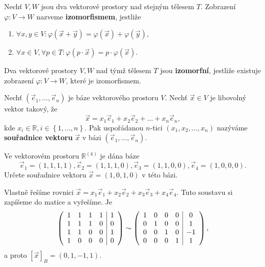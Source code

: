 \begin{definition}
	Nechť $V, W$ jsou dva vektorové prostory nad stejným tělesem $T$. Zobrazení $\varphi :V\to W$ nazveme \textbf{izomorfismem},
	jestliže
	\begin{enumerate}[$i.$]
    \item $\forall x,y \in V\colon \varphi(\vec x+\vec y)=\varphi(\vec x)+\varphi(\vec y),$
    	\item $\forall x \in V, \forall p \in T\colon \varphi(p\cdot \vec x) = p\cdot \varphi(\vec x).$
    \end{enumerate}
\end{definition}

\begin{definition}
    Dva vektorové prostory $V,W$ nad týmž tělesem $T$ jsou \textbf{izomorfní}, jestliže existuje zobrazení
    $\varphi: V\to W$, které je izomorfismem.
\end{definition}

\begin{definition}
    Nechť $(\vec e_1, \dots, \vec e_n)$ je báze vektorového prostoru $V$. Nechť
    $\vec x \in V$ je libovolný vektor takový, že
    $$\vec x = x_1\vec e_1 + x_2\vec e_2 + \dots + x_n\vec e_n,$$
    kde $x_i \in \mathbb R, i\in \left \{ 1,\dots,n \right \} .$ Pak uspořádanou
    $n$-tici $(x_1, x_2,\dots,x_n)$ nazýváme \textbf{souřadnice vektoru} $\vec x$ v
    bázi $(\vec e_1, \dots, \vec e_n)$.
\end{definition}

\begin{priklad}
Ve vektorovém prostoru $\mathbb R^{(4)}$ je dána báze
\begin{equation*}
    \vec e_1=(1,1,1,1), \vec e_2 = (1,1,1,0), \vec e_3 = (1,1,0,0), \vec e_4 = (1,0,0,0).
\end{equation*}
Určete souřadnice vektoru $\vec x = (1,0,1,0)$ v této bázi.
\end{priklad}

\begin{reseni}
Vlastně řešíme rovnici $\vec x= x_1\vec e_1 + x_2\vec e_2 + x_3\vec e_3 + x_4\vec e_4.$
Tuto soustavu si zapíšeme do matice a vyřešíme. Je
$$
\left (
\begin{array}{c c c c | c }
    1 & 1 & 1 & 1 & 1 \\
	1 & 1 & 1 & 0 & 0 \\
	1 & 1 & 0 & 0 & 1\\
	1 & 0 & 0 & 0 & 0
\end{array}
\right ) \sim \left (
\begin{array}{c c c c | c }
    1 & 0 & 0 & 0 & 0\\
    0 & 1 & 0 & 0 & 1\\
    0 & 0 & 1 & 0 & -1 \\
    0 & 0 & 0 & 1 & 1
\end{array}
\right ),
$$
a proto $[\vec x]_B = (0,1,-1,1)$.
\end{reseni}

